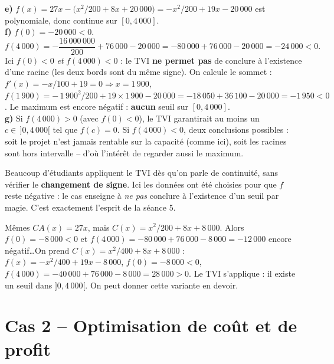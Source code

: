 \documentclass[12pt,a4paper]{article}
\begin{document}
\begin{corrigebox}
\textbf{e)} $f(x)=27x-\bigl(x^2/200+8x+20\,000\bigr)=-x^2/200+19x-20\,000$ est polynomiale, donc continue sur $[0,4\,000]$.\\
\textbf{f)} $f(0)=-20\,000<0$.
$$f(4\,000)=-\frac{16\,000\,000}{200}+76\,000-20\,000=-80\,000+76\,000-20\,000=-24\,000<0.$$
Ici $f(0)<0$ \emph{et} $f(4\,000)<0$ : le TVI \textbf{ne permet pas} de conclure à l'existence d'une racine (les deux bords sont du même signe). On calcule le sommet : $f'(x)=-x/100+19=0 \Rightarrow x=1\,900$, $f(1\,900)=-\,1\,900^2/200+19\times 1\,900-20\,000= -18\,050+36\,100-20\,000=-1\,950<0$. Le maximum est encore négatif : \textbf{aucun} seuil sur $[0,4\,000]$.\\
\textbf{g)} Si $f(4\,000)>0$ (avec $f(0)<0$), le TVI garantirait au moins un $c\in\,]0,4\,000[$ tel que $f(c)=0$. Si $f(4\,000)<0$, deux conclusions possibles : soit le projet n'est jamais rentable sur la capacité (comme ici), soit les racines sont hors intervalle -- d'où l'intérêt de regarder aussi le maximum.
\end{corrigebox}

\begin{attentionbox}
Beaucoup d'étudiants appliquent le TVI dès qu'on parle de continuité, sans vérifier le \textbf{changement de signe}. Ici les données ont été choisies pour que $f$ reste négative : le cas enseigne à \emph{ne pas} conclure à l'existence d'un seuil par magie. C'est exactement l'esprit de la séance 5.
\end{attentionbox}

\begin{gestionbox}
Mêmes $CA(x)=27x$, mais $C(x)=x^2/200+8x+8\,000$. Alors $f(0)=-8\,000<0$ et $f(4\,000)=-80\,000+76\,000-8\,000=-12\,000$ encore négatif\ldots On prend $C(x)=x^2/400+8x+8\,000$ :
$f(x)=-x^2/400+19x-8\,000$, $f(0)=-8\,000<0$, $f(4\,000)=-40\,000+76\,000-8\,000=28\,000>0$. Le TVI s'applique : il existe un seuil dans $]0,4\,000[$. On peut donner cette variante en devoir.
\end{gestionbox}

\section{Cas 2 -- Optimisation de coût et de profit}
\end{document}
